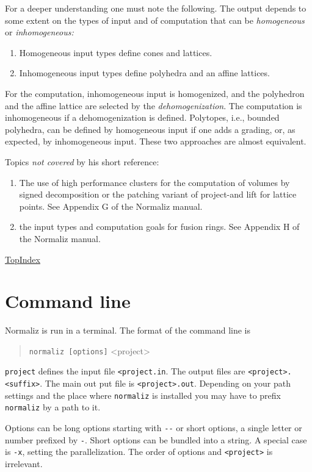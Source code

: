 \documentclass[12pt,a4paper]{scrartcl}
\theoremstyle{definition}
\def\SectStart#1{\section{#1}\label{#1}\def\SectHead{#1}}
\def\TopIndex{\bigskip\bigskip\par \hspace{120pt}\hyperref[Top]{\large Top}\hspace{120pt}\hyperref[Index]{\large Index}\newpage}
\begin{document}
For a deeper understanding one must note the following. The output depends to some extent on the types of input and of computation that can be \emph{homogeneous} or \emph{inhomogeneous:}
\begin{enumerate}
\item Homogeneous input types define cones and lattices.

\item Inhomogeneous input types define polyhedra and an affine lattices.
\end{enumerate}
For the computation, inhomogeneous input is homogenized, and the polyhedron and the affine lattice are selected by the \emph{dehomogenization}. The computation is inhomogeneous if a dehomogenization is defined. Polytopes, i.e., bounded polyhedra, can be defined by homogeneous input if one adds a grading, or, as expected, by inhomogeneous input. These two approaches are almost equivalent.

Topics \emph{not covered} by his short reference:
\begin{enumerate}
\item The use of high performance clusters for the computation of volumes by signed decomposition or the patching variant of project-and lift for lattice points. See Appendix G of the Normaliz manual. 

\item the input types and computation goals for fusion rings. See Appendix H of the Normaliz manual. 
\end{enumerate}

\TopIndex


\SectStart{Command line}

Normaliz is run in a terminal. The format of the command line is
\begin{quote}
	\verb|normaliz [options]| <project>
\end{quote}
\verb|project| defines the input file \verb|<project.in|. The output files are \verb|<project>.<suffix>|. The main out put file is \verb|<project>.out|. Depending on your path settings and the place where \verb|normaliz| is installed you may have to prefix \verb|normaliz| by a path to it.

Options can be long options starting with \verb|--| or short options, a single letter or number prefixed by \verb|-|. Short options can be bundled into a string. A special case is \verb|-x|, setting the parallelization. The order of options and \verb|<project>| is irrelevant. 
\end{document}
